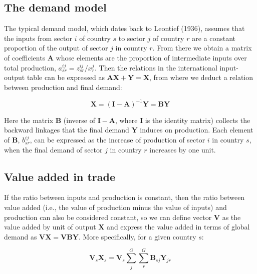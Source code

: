 \hypertarget{the-demand-model}{%
\subsection{The demand model}\label{the-demand-model}}

The typical demand model, which dates back to
Leontief (1936), assumes that the inputs from sector \(i\) of country
\(s\) to sector \(j\) of country \(r\) are a constant proportion of the output of
sector \(j\) in country \(r\). From there we obtain a matrix of coefficients
\(\mathbf{A}\) whose elements are the proportion of intermediate inputs over total
production, \(a_{sr}^{ij} = z_{sr}^{ij} / {x_{r}^{j}}\). Then the relations in the
international input-output table can be expressed as
\(\mathbf{AX}+\mathbf{Y}=\mathbf{X}\), from where we deduct a relation between
production and final demand:

\begin{equation}
  \mathbf{X}=\left(\mathbf{I}-\mathbf{A}\right)^{-1}\mathbf{Y}=\mathbf{BY}
   \label{eq:XBY}
\end{equation}

Here the matrix \(\mathbf{B}\) (inverse of \(\mathbf{I} -\mathbf{A}\), where
\(\mathbf{I}\) is the identity matrix) collects the backward linkages that the
final demand \(\mathbf{Y}\) induces on production. Each element of \(\mathbf{B}\),
\(b_{sr}^{ij}\), can be expressed as the increase of production of sector \(i\) in
country \(s\), when the final demand of sector \(j\) in country \(r\) increases by one
unit.

\hypertarget{value-added-in-trade}{%
\subsection{Value added in trade}\label{value-added-in-trade}}

If the ratio between inputs and production is constant, then the ratio between
value added (i.e., the value of production minus the value of inputs) and
production can also be considered constant, so we can define vector \(\mathbf{V}\)
as the value added by unit of output \(\mathbf{X}\) and express the value added in
terms of global demand as \(\mathbf{V} \mathbf{X} = \mathbf{V} \mathbf{BY}\). More
specifically, for a given country \(s\):

\begin{equation}
  \mathbf{V}_s \mathbf{X}_s =
    \mathbf{V}_s \sum_{j}^{G}\sum_{r}^{G}{\mathbf{B}_{sj} \mathbf{Y}_{jr}}
    \label{eq:VBY}
\end{equation}

